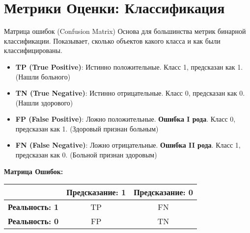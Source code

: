 \section{Метрики Оценки: Классификация}

\begin{myblock}{Матрица ошибок (Confusion Matrix)}
    Основа для большинства метрик бинарной классификации. Показывает, сколько объектов какого класса и как были классифицированы.
    \begin{itemize}
        \item \textbf{TP (True Positive)}: Истинно положительные. Класс 1, предсказан как 1. (Нашли больного)
        \item \textbf{TN (True Negative)}: Истинно отрицательные. Класс 0, предсказан как 0. (Нашли здорового)
        \item \textbf{FP (False Positive)}: Ложно положительные. \textbf{Ошибка I рода}. Класс 0, предсказан как 1. (Здоровый признан больным)
        \item \textbf{FN (False Negative)}: Ложно отрицательные. \textbf{Ошибка II рода}. Класс 1, предсказан как 0. (Больной признан здоровым)
    \end{itemize}
    \vspace{1ex}
    \textbf{Матрица Ошибок:}
    \vspace{0.5ex}
    \begin{center} %
    \begin{tabular}{c|c|c}
         & \textbf{Предсказание: 1} & \textbf{Предсказание: 0} \\\hline
        \textbf{Реальность: 1} & TP & FN \\\hline
        \textbf{Реальность: 0} & FP & TN \\
    \end{tabular}
    \end{center}
    \vspace{1ex}
\end{myblock}

